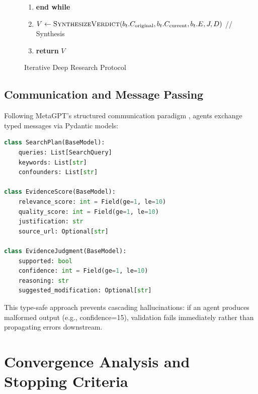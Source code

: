 \begin{figure}[h]
{\begin{minipage}{0.95\textwidth}
\begin{enumerate}
\begin{enumerate}
\begin{enumerate}
        \item $b_t.C_{\text{current}} \gets J.\text{suggested\_modification}$ \hfill // Refine claim
    \end{enumerate}
    \item \textbf{end if}
    \item Update $b_t.\text{cost}, b_t.\text{time}$ based on operations performed
    \item $t \gets t + 1$
\end{enumerate}
\item \textbf{end while}
\item $V \gets \textsc{SynthesizeVerdict}(b_t.C_{\text{original}}, b_t.C_{\text{current}}, b_t.E, J, D)$ \hfill // Synthesis
\item \textbf{return} $V$
\end{enumerate}
\end{minipage}}
\caption{Iterative Deep Research Protocol}
\label{alg:deep_research}
\end{figure}

\subsection{Communication and Message Passing}

Following MetaGPT's structured communication paradigm \citep{hong2024metagpt}, agents exchange typed messages via Pydantic models:

\begin{lstlisting}[language=Python, caption=Structured agent communication schemas]
class SearchPlan(BaseModel):
    queries: List[SearchQuery]
    keywords: List[str]
    confounders: List[str]

class EvidenceScore(BaseModel):
    relevance_score: int = Field(ge=1, le=10)
    quality_score: int = Field(ge=1, le=10)
    justification: str
    source_url: Optional[str]

class EvidenceJudgment(BaseModel):
    supported: bool
    confidence: int = Field(ge=1, le=10)
    reasoning: str
    suggested_modification: Optional[str]
\end{lstlisting}

This type-safe approach prevents cascading hallucinations: if an agent produces malformed output (e.g., confidence=15), validation fails immediately rather than propagating errors downstream.

\section{Convergence Analysis and Stopping Criteria}

